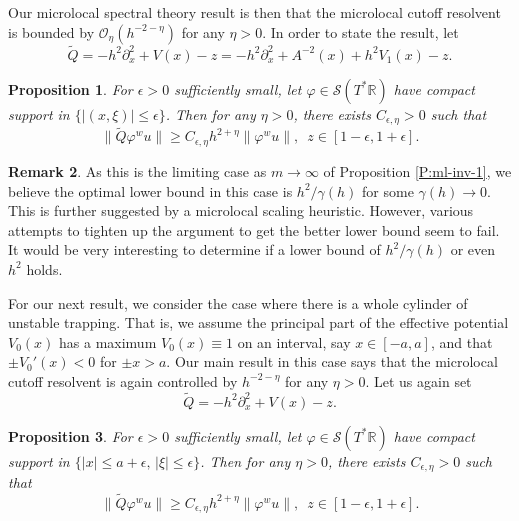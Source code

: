 \documentclass[twoside, final]{amsart}
\newtheorem{proposition}{Proposition}[section]
\theoremstyle{definition}
\newtheorem{remark}[proposition]{Remark}
\numberwithin{equation}{section}
\begin{document}
Our microlocal spectral theory result is then that the microlocal
cutoff resolvent is bounded by ${{\mathcal O}}_\eta (h^{-2-\eta})$ for any $\eta>0$.  In order to state the
result,  let 
\[
{\widetilde{Q}} = -h^2 {\partial}_x^2 + V(x) -z = -h^2 {\partial}_x^2 + A^{-2}(x) + h^2 V_1(x) -z.
\]

\begin{proposition}
\label{P:ml-inv-3a}
For $\epsilon>0$ sufficiently small, let ${\varphi} \in {{\mathcal S}}(T^* {{\mathbb R}})$
have compact support in $\{ |(x,\xi) |{\leqslant} \epsilon\}$.  Then for any
$\eta>0$, there
exists $C_{\epsilon, \eta}>0$ such that 
\begin{equation}
\label{E:ml-inv-3a}
\| {\widetilde{Q}} {\varphi}^w u \| {\geqslant} C_{\epsilon, \eta} h^{2+ \eta} \|
{\varphi}^w u \|, \,\,\, z \in [1-\epsilon, 1 + \epsilon].
\end{equation}
\end{proposition}

\begin{remark}
As this is the limiting case as $m \to \infty$ of Proposition
\ref{P:ml-inv-1}, we believe the optimal lower bound in this case is $h^2/
\gamma(h)$ for some $\gamma(h) \to 0$.  This is further suggested by a
microlocal scaling
heuristic.  However, various attempts to
tighten up the argument to get the better lower bound seem to fail.
It would be very interesting to determine if a lower bound of $h^2 /
\gamma(h)$ or even $h^2$ holds.

\end{remark}

For our next result, we consider the case where there is a whole
cylinder of unstable trapping.  That is, we assume the principal part
of the effective potential
$V_0(x)$ has a maximum $V_0(x) \equiv 1$ on an interval, say $x \in
[-a,a]$, and that $\pm V_0'(x) <0$ for $\pm x > a$.  Our main result in
this case says that the microlocal cutoff resolvent is again 
controlled by $h^{-2- \eta}$ for any $\eta>0$.  Let us again set 
\[
{\widetilde{Q}} = -h^2 {\partial}_x^2 + V(x) -z.
\]

\begin{proposition}
\label{P:ml-inv-3b}
For $\epsilon>0$ sufficiently small, let ${\varphi} \in {{\mathcal S}}(T^* {{\mathbb R}})$
have compact support in $\{ |x| {\leqslant} a + \epsilon,\, |\xi |{\leqslant}
\epsilon\}$.  Then for any $\eta>0$, there
exists $C_{\epsilon, \eta}>0$ such that 
\begin{equation}
\label{E:ml-inv-3b}
\| {\widetilde{Q}} {\varphi}^w u \| {\geqslant} C_{\epsilon, \eta} h^{2+ \eta}\|
{\varphi}^w u \|, \,\,\, z \in [1-\epsilon, 1 + \epsilon].
\end{equation}
\end{proposition}
\end{document}
